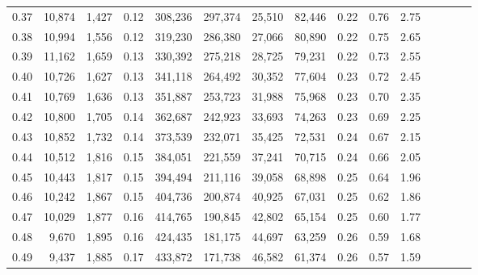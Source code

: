 \begin{tabular}{rrrcrrrrrrrrrrr}
0.37 &  10,874 &  1,427 &                                       0.12 &  308,236 &  297,374 &   25,510 &   82,446 &  0.22 &  0.76 &                         2.75 \\
0.38 &  10,994 &  1,556 &                                       0.12 &  319,230 &  286,380 &   27,066 &   80,890 &  0.22 &  0.75 &                         2.65 \\
0.39 &  11,162 &  1,659 &                                       0.13 &  330,392 &  275,218 &   28,725 &   79,231 &  0.22 &  0.73 &                         2.55 \\
0.40 &  10,726 &  1,627 &                                       0.13 &  341,118 &  264,492 &   30,352 &   77,604 &  0.23 &  0.72 &                         2.45 \\
0.41 &  10,769 &  1,636 &                                       0.13 &  351,887 &  253,723 &   31,988 &   75,968 &  0.23 &  0.70 &                         2.35 \\
0.42 &  10,800 &  1,705 &                                       0.14 &  362,687 &  242,923 &   33,693 &   74,263 &  0.23 &  0.69 &                         2.25 \\
0.43 &  10,852 &  1,732 &                                       0.14 &  373,539 &  232,071 &   35,425 &   72,531 &  0.24 &  0.67 &                         2.15 \\
0.44 &  10,512 &  1,816 &                                       0.15 &  384,051 &  221,559 &   37,241 &   70,715 &  0.24 &  0.66 &                         2.05 \\
0.45 &  10,443 &  1,817 &                                       0.15 &  394,494 &  211,116 &   39,058 &   68,898 &  0.25 &  0.64 &                         1.96 \\
0.46 &  10,242 &  1,867 &                                       0.15 &  404,736 &  200,874 &   40,925 &   67,031 &  0.25 &  0.62 &                         1.86 \\
0.47 &  10,029 &  1,877 &                                       0.16 &  414,765 &  190,845 &   42,802 &   65,154 &  0.25 &  0.60 &                         1.77 \\
0.48 &   9,670 &  1,895 &                                       0.16 &  424,435 &  181,175 &   44,697 &   63,259 &  0.26 &  0.59 &                         1.68 \\
0.49 &   9,437 &  1,885 &                                       0.17 &  433,872 &  171,738 &   46,582 &   61,374 &  0.26 &  0.57 &                         1.59 \\

\end{tabular}
